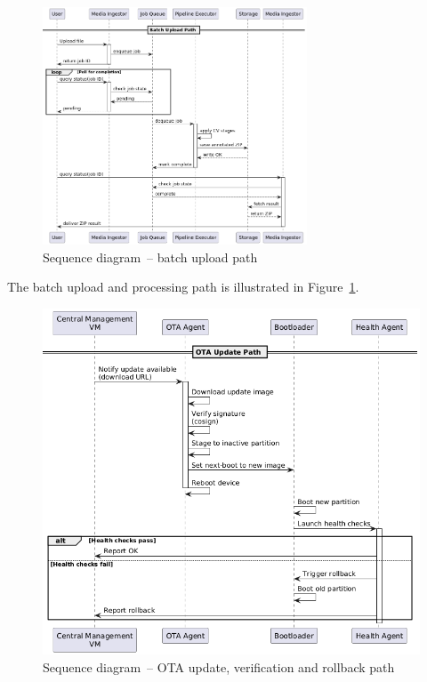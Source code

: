 \documentclass[11pt,a4paper]{article}
\begin{document}
\begin{figure}[H]
  \centering
  \includegraphics[width=0.7\textwidth]{fig/batch_sequence.png}
  \caption{Sequence diagram – batch upload path}
  \label{fig:seq_batch}
\end{figure}
The batch upload and processing path is illustrated in Figure~\ref{fig:seq_batch}.

\begin{figure}[H]
  \centering
  \includegraphics[width=\textwidth]{fig/ota_sequence.png}
  \caption{Sequence diagram – OTA update, verification and rollback path}
  \label{fig:seq_ota}
\end{figure}
\end{document}
